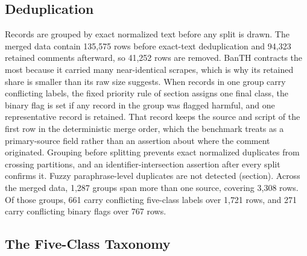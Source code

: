 \documentclass[11pt,a4paper]{article}
\def\cref#1{section}%
\begin{document}
\subsection{Deduplication}
\label{sec:dedup}

Records are grouped by exact normalized text before any split is drawn. The merged data contain 135{,}575 rows before exact-text deduplication and 94{,}323 retained comments afterward, so 41{,}252 rows are removed. BanTH contracts the most because it carried many near-identical scrapes, which is why its retained share is smaller than its raw size suggests. When records in one group carry conflicting labels, the fixed priority rule of \cref{eq:priority} assigns one final class, the binary flag is set if any record in the group was flagged harmful, and one representative record is retained. That record keeps the source and script of the first row in the deterministic merge order, which the benchmark treats as a primary-source field rather than an assertion about where the comment originated. Grouping before splitting prevents exact normalized duplicates from crossing partitions, and an identifier-intersection assertion after every split confirms it. Fuzzy paraphrase-level duplicates are not detected (\cref{sec:limitations}). Across the merged data, 1{,}287 groups span more than one source, covering 3{,}308 rows. Of those groups, 661 carry conflicting five-class labels over 1{,}721 rows, and 271 carry conflicting binary flags over 767 rows.

\subsection{The Five-Class Taxonomy}
\label{sec:taxonomy}
\end{document}

